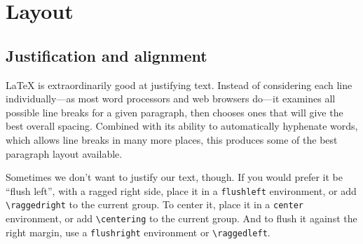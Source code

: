\chapter{Layout}

\section{Justification and alignment}

\LaTeX{} is extraordinarily good at justifying text.
Instead of considering each line individually---as most word processors and
web browsers do---it examines all possible line breaks for a given paragraph,
then chooses ones that will give the best overall
spacing.\punckern{}
Combined with its ability to automatically hyphenate words,
which allows line breaks in many more places,\punckern{}
this produces some of the best paragraph layout available.

Sometimes we don't want to justify our text, though.
If you would prefer it be ``flush left''\quotekern,
with a ragged right side, place it in a \texttt{flushleft} environment,
or add \verb|\raggedright| to the current group.
To center it, place it in a
\texttt{center} environment, or add \verb|\centering| to the current group.
And to flush it against the right margin,
use a \texttt{flushright} environment or \verb|\raggedleft|.

